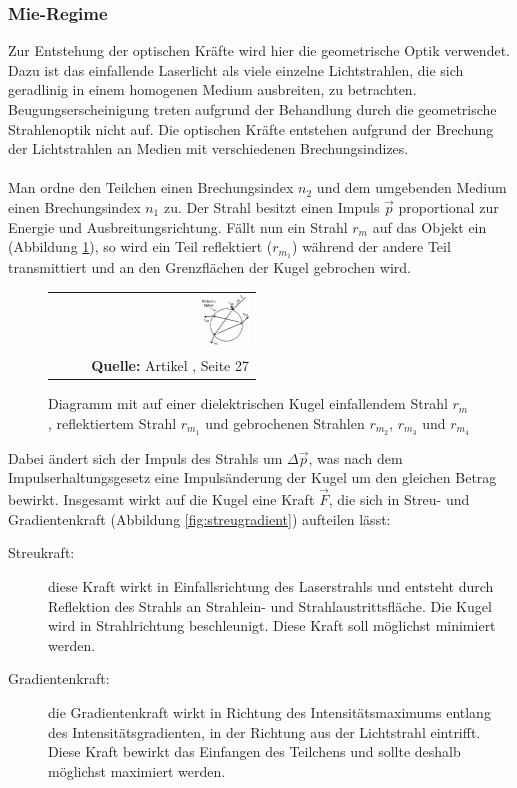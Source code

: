 \documentclass[a4paper,titlepage]{scrartcl}
\numberwithin{equation}{section}
\begin{document}
\subsubsection{Mie-Regime}
Zur Entstehung der optischen Kräfte wird hier die geometrische Optik verwendet. Dazu ist das einfallende Laserlicht als viele einzelne Lichtstrahlen, die sich geradlinig in einem homogenen Medium ausbreiten, zu betrachten. Beugungserscheinigung treten aufgrund der Behandlung durch die geometrische Strahlenoptik nicht auf. Die optischen Kräfte entstehen aufgrund der Brechung der Lichtstrahlen an Medien mit verschiedenen Brechungsindizes.\\ \\
Man ordne den Teilchen einen Brechungsindex $n_2$ und dem umgebenden Medium einen Brechungsindex $n_1$ zu. Der Strahl besitzt einen Impuls $\vec{p}$ proportional zur Energie und Ausbreitungsrichtung. Fällt nun ein Strahl $r_m$ auf das Objekt ein (Abbildung \ref{fig:strahlen}), so wird ein Teil reflektiert ($r_{m_1}$) während der andere Teil transmittiert und an den Grenzflächen der Kugel gebrochen wird.
\begin{figure}[H]
	\centering
	\begin{tabular}{@{}r@{}}
		\includegraphics[width=0.25\textwidth]{strahlen.PNG}\\
		\footnotesize\sffamily\textbf{Quelle:} Artikel \cite{smith1999}, Seite 27
	\end{tabular}
	\caption{Diagramm mit auf einer dielektrischen Kugel einfallendem Strahl $r_m$, reflektiertem Strahl $r_{m_1}$ und gebrochenen Strahlen $r_{m_2}$, $r_{m_3}$ und $r_{m_4}$}
    \label{fig:strahlen}
\end{figure}
Dabei ändert sich der Impuls des Strahls um $\Delta \vec{p}$, was nach dem Impulserhaltungsgesetz eine Impulsänderung der Kugel um den gleichen Betrag bewirkt. Insgesamt wirkt auf die Kugel eine Kraft $\vec{F}$, die sich in Streu- und Gradientenkraft (Abbildung \ref{fig:streugradient}) aufteilen lässt:
\begin{description}
\item[Streukraft:] diese Kraft wirkt in Einfallsrichtung des Laserstrahls und entsteht durch Reflektion des Strahls an Strahlein- und Strahlaustrittsfläche. Die Kugel wird in Strahlrichtung beschleunigt. Diese Kraft soll möglichst minimiert werden.
\item[Gradientenkraft:] die Gradientenkraft wirkt in Richtung des Intensitätsmaximums entlang des Intensitätsgradienten, in der Richtung aus der Lichtstrahl eintrifft. Diese Kraft bewirkt das Einfangen des Teilchens und sollte deshalb möglichst maximiert werden.
\end{description}
\end{document}
